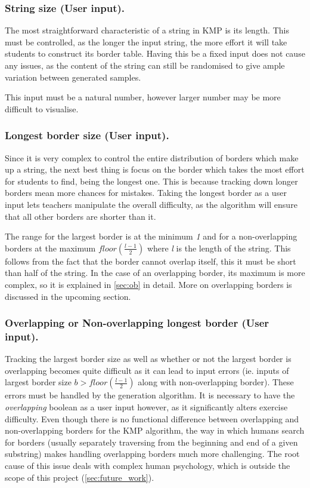 \documentclass{l4proj}
\begin{document}
\subsubsection{String size (User input).}

The most straightforward characteristic of a string in KMP is its length. This must be controlled, as the longer the input string, the more effort it will take students to construct its border table. Having this be a fixed input does not cause any issues, as the content of the string can still be randomised to give ample variation between generated samples.

This input must be a natural number, however larger number may be more difficult to visualise.

\subsubsection{Longest border size (User input).}

Since it is very complex to control the entire distribution of borders which make up a string, the next best thing is focus on the border which takes the most effort for students to find, being the longest one. This is because tracking down longer borders mean more chances for mistakes. Taking the longest border as a user input lets teachers manipulate the overall difficulty, as the algorithm will ensure that all other borders are shorter than it.

The range for the largest border is at the minimum \emph{1} and for a non-overlapping borders at the maximum $floor(\frac{l-1}{2})$ where \emph{l} is the length of the string. This follows from the fact that the border cannot overlap itself, this it must be short than half of the string. In the case of an overlapping border, its maximum is more complex, so it is explained in \autoref{sec:ob} in detail. More on overlapping borders is discussed in the upcoming section.

\subsubsection{Overlapping or Non-overlapping longest border (User input).}

Tracking the largest border size as well as whether or not the largest border is overlapping becomes quite difficult as it can lead to input errors (ie. inputs of largest border size $b > floor(\frac{l-1}{2})$ along with non-overlapping border). These errors must be handled by the generation algorithm. It is necessary to have the \emph{overlapping} boolean as a user input however, as it significantly alters exercise difficulty. Even though there is no functional difference between overlapping and non-overlapping borders for the KMP algorithm, the way in which humans search for borders (usually separately traversing from the beginning and end of a given substring) makes handling overlapping borders much more challenging. The root cause of this issue deals with complex human psychology, which is outside the scope of this project (\autoref{sec:future_work}).
\end{document}

